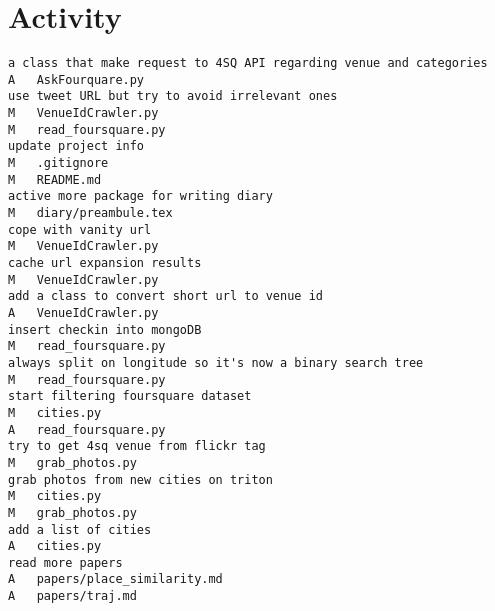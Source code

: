 \section*{Activity}
\begin{verbatim}
a class that make request to 4SQ API regarding venue and categories
A	AskFourquare.py
use tweet URL but try to avoid irrelevant ones
M	VenueIdCrawler.py
M	read_foursquare.py
update project info
M	.gitignore
M	README.md
active more package for writing diary
M	diary/preambule.tex
cope with vanity url
M	VenueIdCrawler.py
cache url expansion results
M	VenueIdCrawler.py
add a class to convert short url to venue id
A	VenueIdCrawler.py
insert checkin into mongoDB
M	read_foursquare.py
always split on longitude so it's now a binary search tree
M	read_foursquare.py
start filtering foursquare dataset
M	cities.py
A	read_foursquare.py
try to get 4sq venue from flickr tag
M	grab_photos.py
grab photos from new cities on triton
M	cities.py
M	grab_photos.py
add a list of cities
A	cities.py
read more papers
A	papers/place_similarity.md
A	papers/traj.md
\end{verbatim}
